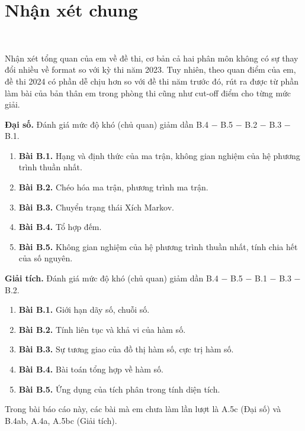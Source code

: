 \section{Nhận xét chung}
~

Nhận xét tổng quan của em về đề thi, cơ bản cả hai phân môn không có sự thay đổi nhiều về format so với kỳ thi năm 2023. Tuy nhiên, theo quan điểm của em, đề thi 2024 có phần dễ chịu hơn so với đề thi năm trước đó, rút ra được từ phần làm bài của bản thân em trong phòng thi cũng như cut-off điểm cho từng mức giải. 

\textbf{Đại số. } Đánh giá mức độ khó (chủ quan) giảm dần B.4 $-$ B.5 $-$ B.2 $-$ B.3 $-$ B.1.
    \begin{enumerate}
        \item[] {\textbf{Bài B.1.} Hạng và định thức của ma trận, không gian nghiệm của hệ phương trình thuần nhất.}
        \item[] {\textbf{Bài B.2.} Chéo hóa ma trận, phương trình ma trận.}
        \item[] {\textbf{Bài B.3.} Chuyển trạng thái Xích Markov.}
        \item[] {\textbf{Bài B.4.} Tổ hợp đếm.}
        \item[] {\textbf{Bài B.5.} Không gian nghiệm của hệ phương trình thuần nhất, tính chia hết của số nguyên.}
    \end{enumerate}

\textbf{Giải tích. } Đánh giá mức độ khó (chủ quan) giảm dần B.4 $-$ B.5 $-$ B.1 $-$ B.3 $-$ B.2.
    \begin{enumerate}
        \item[] {\textbf{Bài B.1.} Giới hạn dãy số, chuỗi số.}
        \item[] {\textbf{Bài B.2.} Tính liên tục và khả vi của hàm số.}
        \item[] {\textbf{Bài B.3.} Sự tương giao của đồ thị hàm số, cực trị hàm số.}
        \item[] {\textbf{Bài B.4.} Bài toán tổng hợp về hàm số.}
        \item[] {\textbf{Bài B.5.} Ứng dụng của tích phân trong tính diện tích.}
    \end{enumerate}

Trong bài báo cáo này, các bài mà em chưa làm lần lượt là A.5c (Đại số) và B.4ab, A.4a, A.5bc (Giải tích).